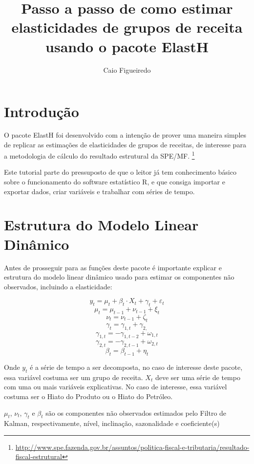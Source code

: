 \documentclass[11pt,a4paper,oneside]{report}
\begin{document}
\title{Passo a passo de como estimar elasticidades de grupos de receita usando
  o pacote ElastH}
\author[1]{Caio Figueiredo}
\maketitle
\tableofcontents


\section*{Introdução}

O pacote ElastH foi desenvolvido com a intenção de prover uma
maneira simples de replicar as estimações de elasticidades de grupos de
receitas, de interesse para a metodologia de cálculo do resultado estrutural da SPE/MF.
\footnote{\url{http://www.spe.fazenda.gov.br/assuntos/politica-fiscal-e-tributaria/resultado-fiscal-estrutural}}

Este tutorial parte do pressuposto de que o leitor já tem conhecimento 
básico sobre o funcionamento do software estatístico R, e que consiga importar e
exportar dados, criar variáveis e trabalhar com séries de tempo.

\section*{Estrutura do Modelo Linear Dinâmico}

Antes de prosseguir para as funções deste pacote é importante explicar e
estrutura do modelo linear dinâmico usado para estimar os componentes não
observados, incluindo a elasticidade:

\[y_t = \mu_t + \beta_t \cdot{X_t} + \gamma_t + \varepsilon_t\]
\[\mu_t = \mu_{t-1} + \nu_{t-1} + \xi_t\]
\[\nu_t = \nu_{t-1} + \zeta_t\]
\[\gamma_t = \gamma_{1,t} + \gamma_{2,}\]
\[\gamma_{1,t} = - \gamma_{1,t-2} + \omega_{1,t}\]
\[\gamma_{2,t} = - \gamma_{2,t-1} + \omega_{2,t}\]
\[\beta_t = \beta_{t-1} + \eta_t\]

Onde \(y_t\) é a série de tempo a ser decomposta, no caso de
interesse deste pacote, essa variável costuma ser um grupo de receita. \(X_t\)
deve ser uma série de tempo com uma ou mais variáveis explicativas. No caso de
interesse, essa variável costuma ser o Hiato do Produto ou o Hiato do Petróleo.

\(\mu_t\), \(\nu_t\), \(\gamma_t\) e \(\beta_t\) são os componentes não
observados estimados pelo Filtro de Kalman, respectivamente, nível,
inclinação, sazonalidade e coeficiente(s)
\end{document}

